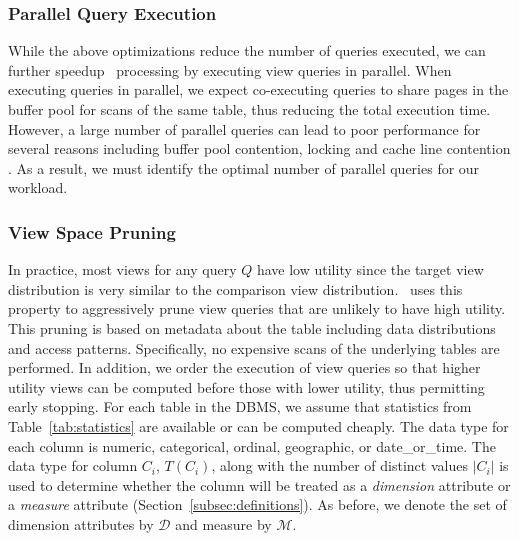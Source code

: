 
  \subsubsection {Parallel Query Execution}
  \label{subsec:parallel_exec}
  While the above optimizations reduce the number of queries executed, we can
  further speedup \SeeDB\ processing by executing view queries in parallel. When
  executing queries in parallel, we expect co-executing queries to share pages in the
  buffer pool for scans of the same table, thus reducing the total execution
  time. However, a large number of parallel queries can lead to poor
  performance for several reasons including buffer pool contention, locking and
  cache line contention \cite{Postgres_wiki}. As a result, we must identify the
  optimal number of parallel queries for our workload.
  
  
\subsubsection{View Space Pruning}
In practice, most views for any query $Q$ have low utility since the target view
distribution is very similar to the comparison view distribution. 
\SeeDB\ uses this property to aggressively prune 
view queries that are unlikely to have high utility. 
This pruning is based on metadata about the table including data
distributions and access patterns. 
Specifically, no expensive scans of the underlying
tables are performed. In addition, we order the execution of view queries so
that higher utility views can be computed before those with lower utility,
thus permitting early stopping. For each table in the DBMS, we assume that
statistics from Table~\ref{tab:statistics} are available or can be computed
cheaply. The data type for each column is numeric, categorical, ordinal, geographic, or
date\_or\_time. The data type for column $C_i$, $T(C_i)$, along with the number
of distinct values $|C_i|$ is used to determine whether the column will be
treated as a {\it dimension} attribute or a {\it measure}
attribute (Section~\ref{subsec:definitions}). As before, we denote the set of
dimension attributes by $\mathcal{D}$ and measure by $\mathcal{M}$.

